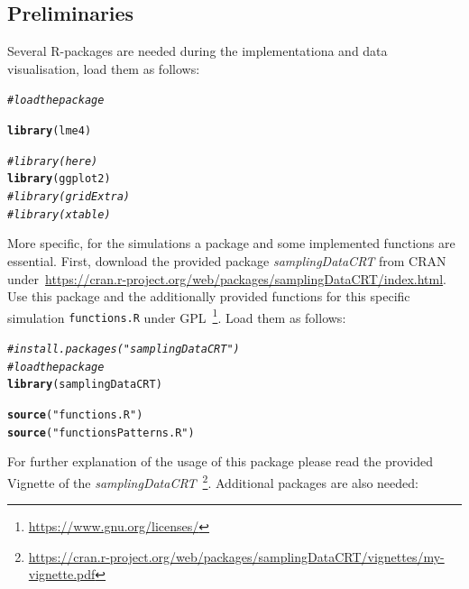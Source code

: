\documentclass{article}\usepackage[]{graphicx}\usepackage[]{color}
\makeatletter
\newcommand{\hlstr}[1]{\textcolor[rgb]{0.192,0.494,0.8}{#1}}%
\newcommand{\hlcom}[1]{\textcolor[rgb]{0.678,0.584,0.686}{\textit{#1}}}%
\newcommand{\hlstd}[1]{\textcolor[rgb]{0.345,0.345,0.345}{#1}}%
\newcommand{\hlkwd}[1]{\textcolor[rgb]{0.737,0.353,0.396}{\textbf{#1}}}%
\newenvironment{kframe}{%
 \def\at@end@of@kframe{}%
 \ifinner\ifhmode%
  \def\at@end@of@kframe{\end{minipage}}%
  \begin{minipage}{\columnwidth}%
 \fi\fi%
 \def\FrameCommand##1{\hskip\@totalleftmargin \hskip-\fboxsep
 \colorbox{shadecolor}{##1}\hskip-\fboxsep
     \hskip-\linewidth \hskip-\@totalleftmargin \hskip\columnwidth}%
 \MakeFramed {\advance\hsize-\width
   \@totalleftmargin\z@ \linewidth\hsize
   \@setminipage}}%
 {\par\unskip\endMakeFramed%
 \at@end@of@kframe}
\newenvironment{knitrout}{}{} %
\newcommand{\Robject}[1]{{\texttt{#1}}}
\newcommand{\Rpackage}[1]{{\textit{#1}}}
\makeatother
\begin{document}
\subsection{Preliminaries}

Several R-packages are needed during the implementationa and data visualisation, load them as follows:


\begin{knitrout}
\color{fgcolor}\begin{kframe}
\begin{alltt}
\hlcom{#load the package}

\hlkwd{library}\hlstd{(lme4)}
\end{alltt}


{\ttfamily\noindent\itshape\color{messagecolor}{\#\# Loading required package: Matrix}}\begin{alltt}
\hlcom{#library(here)}
\hlkwd{library}\hlstd{(ggplot2)}
\hlcom{#library(gridExtra)}
\hlcom{#library(xtable)}
\end{alltt}
\end{kframe}
\end{knitrout}


More specific, for the simulations a package and some implemented functions are essential.
First, download the provided package \Rpackage{samplingDataCRT} from CRAN under~\url{https://cran.r-project.org/web/packages/samplingDataCRT/index.html}. Use this package and the additionally provided functions for this specific simulation \Robject{functions.R} under GPL~\footnote{\url{https://www.gnu.org/licenses/}}. Load them as follows:

\begin{knitrout}
\color{fgcolor}\begin{kframe}
\begin{alltt}
\hlcom{#install.packages("samplingDataCRT")}
\hlcom{#load the package}
\hlkwd{library}\hlstd{(samplingDataCRT)}

\hlkwd{source}\hlstd{(}\hlstr{"functions.R"}\hlstd{)}
\hlkwd{source}\hlstd{(}\hlstr{"functionsPatterns.R"}\hlstd{)}
\end{alltt}
\end{kframe}
\end{knitrout}

For further explanation of the usage of this package please read the provided Vignette of the 
\Rpackage{samplingDataCRT}~\footnote{\url{https://cran.r-project.org/web/packages/samplingDataCRT/vignettes/my-vignette.pdf}}. Additional packages are also needed:
\end{document}
